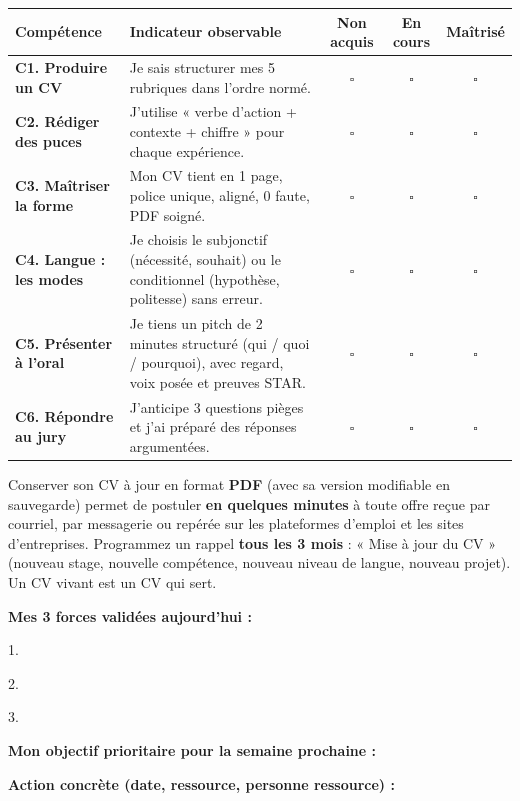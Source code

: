 \documentclass[11pt]{article}
\begin{document}
\begin{aretenir}
\begin{center}
\begin{tabularx}{\linewidth}{|l|X|c|c|c|}\hline
\rowcolor{popblueL} \textbf{Compétence} & \textbf{Indicateur observable} & \textbf{Non acquis} & \textbf{En cours} & \textbf{Maîtrisé} \\ \hline
\textbf{C1. Produire un CV} & Je sais structurer mes 5 rubriques dans l'ordre normé. & $\square$ & $\square$ & $\square$ \\ \hline
\textbf{C2. Rédiger des puces} & J'utilise « verbe d'action + contexte + chiffre » pour chaque expérience. & $\square$ & $\square$ & $\square$ \\ \hline
\textbf{C3. Maîtriser la forme} & Mon CV tient en 1 page, police unique, aligné, 0 faute, PDF soigné. & $\square$ & $\square$ & $\square$ \\ \hline
\textbf{C4. Langue : les modes} & Je choisis le subjonctif (nécessité, souhait) ou le conditionnel (hypothèse, politesse) sans erreur. & $\square$ & $\square$ & $\square$ \\ \hline
\textbf{C5. Présenter à l'oral} & Je tiens un pitch de 2 minutes structuré (qui / quoi / pourquoi), avec regard, voix posée et preuves STAR. & $\square$ & $\square$ & $\square$ \\ \hline
\textbf{C6. Répondre au jury} & J'anticipe 3 questions pièges et j'ai préparé des réponses argumentées. & $\square$ & $\square$ & $\square$ \\ \hline
\end{tabularx}
\end{center}
\end{aretenir}

\begin{savaistu}
Conserver son CV à jour en format \textbf{PDF} (avec sa version modifiable en sauvegarde) permet de postuler \textbf{en quelques minutes} à toute offre reçue par courriel, par messagerie ou repérée sur les plateformes d'emploi et les sites d'entreprises. Programmez un rappel \textbf{tous les 3 mois} : « Mise à jour du CV » (nouveau stage, nouvelle compétence, nouveau niveau de langue, nouveau projet). Un CV vivant est un CV qui sert.
\end{savaistu}

\begin{exemplebox}
\textbf{Mes 3 forces validées aujourd'hui :}

1. \dotfill

2. \dotfill

3. \dotfill

\textbf{Mon objectif prioritaire pour la semaine prochaine :}

\dotfill

\textbf{Action concrète (date, ressource, personne ressource) :}

\dotfill
\end{exemplebox}
\end{document}
